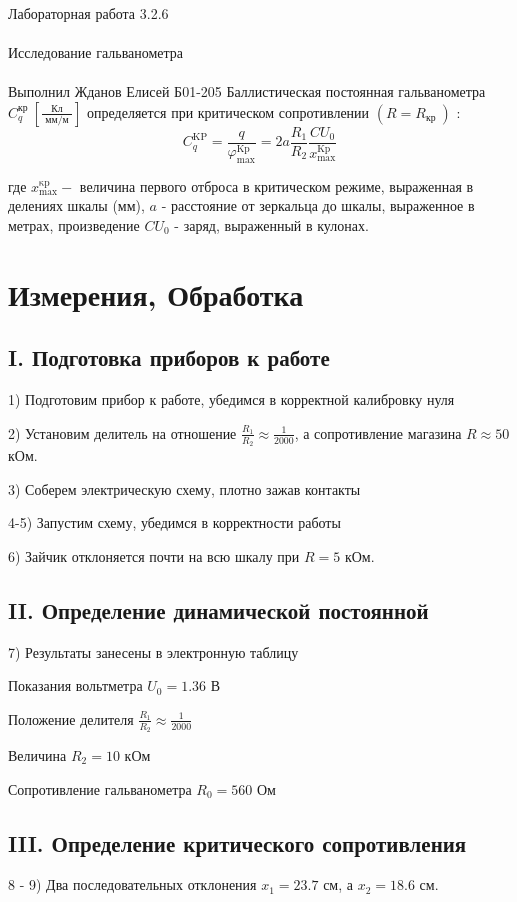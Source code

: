 \documentclass{astroedu-lab}
\begin{document}
\begin{problem}{\huge Лабораторная работа 3.2.6\\\\Исследование гальванометра\\\\Выполнил Жданов Елисей Б01-205}
Баллистическая постоянная гальванометра $C_q^{\text {кр }}\left[\frac{\text { Кл }}{\text { мм/м }}\right]$ определяется при критическом сопротивлении $\left(R=R_{\text {кр }}\right)$ :
$$
C_q^{\mathrm{KP}}=\frac{q}{\varphi_{\max }^{\mathrm{Kp}}}=2 a \frac{R_1}{R_2} \frac{C U_0}{x_{\max }^{\mathrm{Kp}}}
$$

где $x_{\max }^{\mathrm{\kappa p}}-$ величина первого отброса в критическом режиме, выраженная в делениях шкалы (мм), $a$ - расстояние от зеркальца до шкалы, выраженное в метрах, произведение $C U_0$ - заряд, выраженный в кулонах.

\section{Измерения, Обработка}

\subsection{I. Подготовка приборов к работе}

1) Подготовим прибор к работе, убедимся в корректной калибровку нуля

2) Установим делитель на отношение $\frac{R_1}{R_2} \approx \frac{1}{2000}$, а сопротивление магазина $R \approx 50$ кОм.

3) Соберем электрическую схему, плотно зажав контакты

4-5) Запустим схему, убедимся в корректности работы

6) Зайчик отклоняется почти на всю шкалу при $R = 5$ кОм.

\subsection{II. Определение динамической постоянной}

7) Результаты занесены в электронную таблицу

Показания вольтметра $U_0 = 1.36$ В

Положение делителя $\frac{R_1}{R_2} \approx \frac{1}{2000}$

Величина $R_2 = 10$ кОм

Сопротивление гальванометра $R_0 = 560$ Ом

\subsection{III. Определение критического сопротивления}

8 - 9) Два последовательных отклонения $x_1 = 23.7$ см, а $x_2 = 18.6$ см.


\end{problem}
\end{document}
